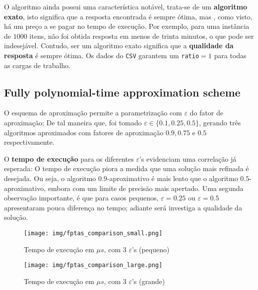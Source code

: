 \documentclass[12pt]{article}
\begin{document}
\vspace{-0.5cm}

O algoritmo ainda possui uma característica notável, trata-se de um \textbf{algoritmo exato}, isto significa que a resposta encontrada é sempre ótima, mas , como visto, há um preço a se pagar no tempo de execução. Por exemplo, para uma instância de \(1000\) itens, não foi obtida resposta em menos de trinta minutos, o que pode ser indesejável. Contudo, ser um algoritmo exato significa que a \textbf{qualidade da resposta} é sempre ótima. Os dados do \texttt{CSV} garantem um \texttt{ratio}\(=1\) para todas as cargas de trabalho.

\subsection{Fully polynomial-time approximation scheme}

O esquema de aproximação permite a parametrização com \(\varepsilon\) do fator de aproximação; De tal maneira que, foi tomado \(\varepsilon \in \{0.1,0.25,0.5\}\), gerando três algoritmos aproximados com fatores de aproximação \(0.9, 0.75\) e \(0.5\) respectivamente.

O \textbf{tempo de execução} para os diferentes \(\varepsilon\)'s evidenciam uma correlação já esperada: O tempo de execução piora a medida que uma solução mais refinada é desejada. Ou seja, o algoritmo \(0.9\)-aproximativo é mais lento que o algoritmo \(0.5\)-aproximativo, embora com um limite de precisão mais apertado. Uma segunda observação importante, é que para casos pequenos, \(\varepsilon=0.25\) ou \(\varepsilon=0.5\) apresentaram pouca diferença no tempo; adiante será investiga a qualidade da solução.

\vspace{-0.5cm}

\begin{figure}[H]
    \centering
    \begin{minipage}[b]{0.48\linewidth}
        \centering
        \texttt{[image: img/fptas\_comparison\_small.png]}
        \caption{Tempo de execução em \(\mu s\), com 3 \(\varepsilon\)'s (pequeno)}
        \label{fig:fptas_small}
    \end{minipage}
    \hfill
    \begin{minipage}[b]{0.48\linewidth}
        \centering
        \texttt{[image: img/fptas\_comparison\_large.png]}
        \caption{Tempo de execução em \(\mu s\), com 3 \(\varepsilon\)'s (grande)}
        \label{fig:fptas_large}
    \end{minipage}
\end{figure}
\end{document}
